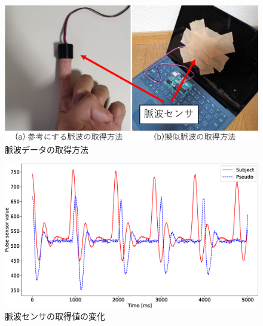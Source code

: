 \documentclass[submit,techrep]{ipsj}
\begin{document}
\begin{figure}[!t]
	\begin{center}
		\includegraphics[width=1\linewidth]{sensors.eps}
	\end{center}
	\vspace{-8mm}
	\caption{脈波データの取得方法}
	\label{fig:sensors}
\end{figure}

\begin{figure}[!t]
	\begin{center}
		\includegraphics[width=1\linewidth]{pulse.eps}
	\end{center}
	\vspace{-8mm}
	\caption{脈波センサの取得値の変化}
	\label{fig:pulse}
\end{figure}




\end{document}
